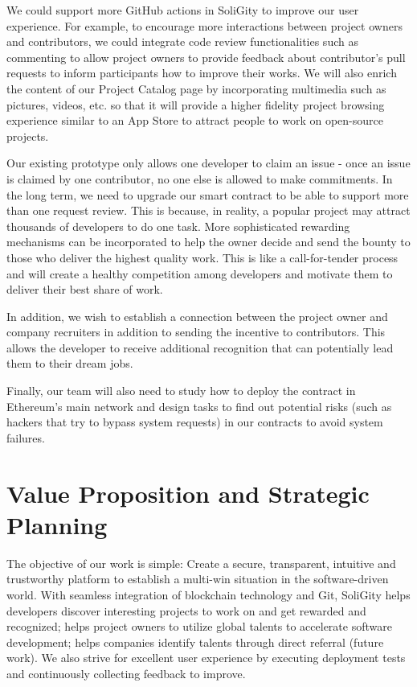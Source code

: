 \documentclass[12pt]{article}
\renewcommand{\_}{\kern-1.5pt\textunderscore\kern-1.5pt}
\begin{document}
We could support more GitHub actions in SoliGity to improve our user experience. For example, to encourage more
interactions between project owners and contributors, we could integrate code review functionalities such as commenting to allow project owners to provide feedback about contributor's pull requests to inform participants how to improve their works. We will also enrich the content of our Project Catalog page by incorporating multimedia such as pictures, videos, etc. so that it will provide a higher fidelity project browsing experience similar to an App Store to attract people to work on open-source projects.

Our existing prototype only allows one developer to claim an issue - once an issue is claimed by one contributor,
no one else is allowed to make commitments. In the long term, we need to upgrade our smart contract to be able to
support more than one request review. This is because, in reality, a popular project may attract thousands of
developers to do one task. More sophisticated rewarding mechanisms can be incorporated to help the owner decide
and send the bounty to those who deliver the highest quality work. This is like a call-for-tender process and
will create a healthy competition among developers and motivate them to deliver their best share of work.

In addition, we wish to establish a connection between the project owner and company recruiters in addition to
sending the incentive to contributors. This allows the developer to receive additional recognition that can
potentially lead them to their dream jobs.

Finally, our team will also need to study how to deploy the contract in Ethereum’s main network and design
tasks to find out potential risks (such as hackers that try to bypass system requests) in our contracts to avoid
system failures.

\section{Value Proposition and Strategic Planning}
The objective of our work is simple: Create a secure, transparent, intuitive and trustworthy platform to establish
a multi-win situation in the software-driven world. With seamless integration of blockchain technology and Git,
SoliGity helps developers discover interesting projects to work on and get rewarded and recognized; helps project
owners to utilize global talents to accelerate software development; helps companies identify talents through direct
referral (future work). We also strive for excellent user experience by executing deployment tests and continuously
collecting feedback to improve.
\end{document}
